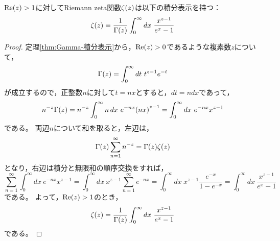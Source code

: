 \documentclass[a4paper,draft]{ltjsarticle}
\begin{document}
\begin{thm}
    $\re{z}>1$に対してRiemann zeta関数$\fun{\zeta}{z}$は以下の積分表示を持つ：
    \begin{equation}
        \fun{\zeta}{z}=\frac{1}{\fun{\Gamma}{z}}\int_0^\infty dx\ \frac{x^{z-1}}{e^x-1}
    \end{equation}

    \begin{proof}
        定理\ref{thm:Gamma-積分表示}から，$\re{z}>0$であるような複素数$z$について，
        \begin{equation}
            \fun{\Gamma}{z}=\int_0^\infty dt\ t^{z-1}e^{-t}
        \end{equation}
        が成立するので，正整数$n$に対して$t=nx$とすると，$dt=ndx$であって，
        \begin{equation}
            n^{-z}\fun{\Gamma}{z}=n^{-z}\int_0^\infty n\, dx\ e^{-nx}\pare{nx}^{z-1}=\int_{0}^\infty dx\ e^{-nx}x^{z-1}
        \end{equation}
        である。
        両辺$n$について和を取ると，左辺は，
        \begin{equation}
            \fun{\Gamma}{z}\sum_{n=1}^\infty n^{-z}=\fun{\Gamma}{z}\fun{\zeta}{z}
        \end{equation}
        となり，右辺は積分と無限和の順序交換をすれば，
        \begin{equation}
            \sum_{n=1}^\infty \int_0^\infty dx\ e^{-nx}x^{z-1}=\int_0^\infty dx\ x^{z-1}\sum_{n=1}^\infty e^{-nx}
            =\int_0^\infty dx\ x^{z-1}\frac{e^{-x}}{1-e^{-x}}
            =\int_0^\infty dx\ \frac{x^{z-1}}{e^x-1}
        \end{equation}
        である。
        よって，$\re{z}>1$のとき，
        \begin{equation}
            \fun{\zeta}{z}=\frac{1}{\fun{\Gamma}{z}}\int_0^\infty dx\ \frac{x^{z-1}}{e^x-1}
        \end{equation}
        である。
    \end{proof}
\end{thm}
\end{document}
